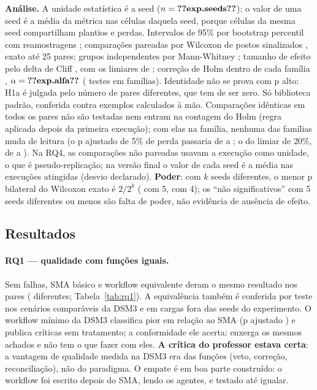 \documentclass[10pt,a4paper]{article}
\begin{document}
\textbf{Análise.} A unidade estatística é a seed ($n = \V{exp.seeds}$): o valor de uma seed é a média da métrica nas
células daquela seed, porque células da mesma seed compartilham plantios e perdas. Intervalos de 95\% por bootstrap
percentil com  reamostragens \parencite{efron1993}; comparações pareadas por Wilcoxon de postos
sinalizados \parencite{wilcoxon1945}, exato até 25 pares; grupos independentes por Mann-Whitney \parencite{mann1947};
tamanho de efeito pelo delta de Cliff \parencite{cliff1993}, com os limiares de \textcite{romano2006}; correção de Holm
dentro de cada família \parencite{holm1979}, $\alpha = \V{exp.alfa}$ ( testes em 
famílias). Identidade não se prova com p alto: H1a é julgada pelo número de pares diferentes, que tem de ser zero. Só
biblioteca padrão, conferida contra exemplos calculados à mão. Comparações idênticas em todos os pares não são testadas
nem entram na contagem do Holm (regra aplicada depois da primeira execução); com elas na família, nenhuma das
 famílias muda de leitura (o p ajustado de 5\% de perda passaria de  a
; o do limiar de 20\%, de  a ). Na RQ4, as comparações
não pareadas usavam a execução como unidade, o que é pseudo-replicação; na versão final o valor de cada seed é a média
nas execuções atingidas (desvio declarado). \textbf{Poder}: com $k$ seeds diferentes, o menor p bilateral do Wilcoxon
exato é $2/2^k$ ( com 5,  com 4); os \enquote{não significativos} com 5 seeds
diferentes ou menos são falta de poder, não evidência de ausência de efeito.

\subsection{Resultados}
\paragraph{RQ1 --- qualidade com funções iguais.} Sem falhas, SMA básico e workflow equivalente deram o mesmo resultado
nos  pares ( diferentes; Tabela~\ref{tab:rq1}). A equivalência também é conferida por
teste nos cenários comparáveis da DSM3 e em cargas fora das seeds do experimento. O workflow mínimo da DSM3 classifica
 pior em relação ao SMA  (p ajustado ) e publica críticas sem tratamento;
a conformidade ele acerta: enxerga os mesmos achados e não tem o que fazer com eles. \textbf{A crítica do professor
estava certa}: a vantagem de qualidade medida na DSM3 era das funções (veto, correção, reconciliação), não do paradigma.
O empate é em boa parte construído: o workflow foi escrito depois do SMA, lendo os agentes, e testado até igualar.
\end{document}
